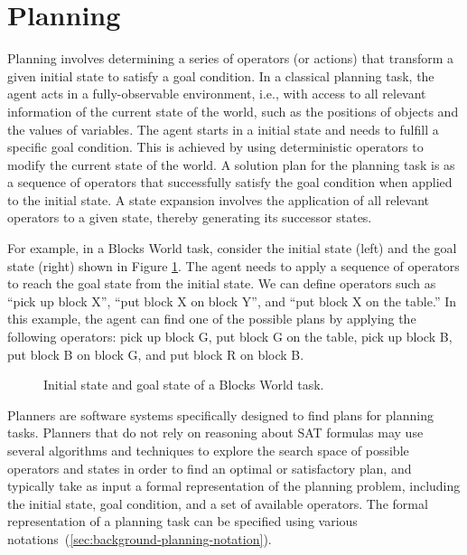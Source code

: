 \documentclass[ppgc,diss,english]{iiufrgs}
\begin{document}
\section{Planning}
\label{sec:intro-planning}
Planning involves determining a series of operators (or actions) that transform a given initial state to satisfy a goal condition.
In a classical planning task, the agent acts in a fully-observable environment, i.e., with access to all relevant information of the current state of the world, such as the positions of objects and the values of variables. The agent starts in a initial state and needs to fulfill a specific goal condition. This is achieved by using deterministic operators to modify the current state of the world. A solution plan for the planning task is as a sequence of operators that successfully satisfy the goal condition when applied to the initial state. A state expansion involves the application of all relevant operators to a given state, thereby generating its successor states.

For example, in a Blocks World task, consider the initial state (left) and the goal state (right) shown in Figure \ref{fig:intro-blocks}. The agent needs to apply a sequence of operators to reach the goal state from the initial state. We can define operators such as ``pick up block X'', ``put block X on block Y'', and ``put block X on the table.'' In this example, the agent can find one of the possible plans by applying the following operators: pick up block G, put block G on the table, pick up block B, put block B on block G, and put block R on block B. %

\begin{figure}[ht]
\caption[Initial state of a Blocks World task]{Initial state and goal state of a Blocks World task.}
\vspace{\baselineskip}
\centering
{}
\label{fig:intro-blocks}
\end{figure}

Planners are software systems specifically designed to find plans for planning tasks. Planners that do not rely on reasoning about SAT formulas may use several algorithms and techniques to explore the search space of possible operators and states in order to find an optimal or satisfactory plan, and typically take as input a formal representation of the planning problem, including the initial state, goal condition, and a set of available operators. The formal representation of a planning task can be specified using various notations~(\cref{sec:background-planning-notation}).
\end{document}
